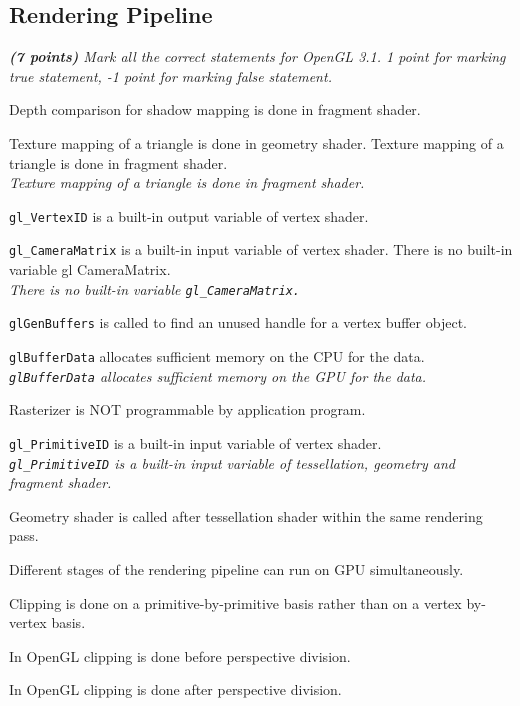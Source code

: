 \documentclass[a4paper,10pt]{article}
\newcommand{\cmark}{\ding{51}}%
\newcommand{\done}{\rlap{$\square$}{\raisebox{2pt}{\large\hspace{1pt}\cmark}}%
	\hspace{-2.5pt}}
\begin{document}
\subsection{Rendering Pipeline}
\textit{\textbf{(7 points)} Mark all the correct statements for OpenGL 3.1. 1 point for marking true statement, -1 point for marking false statement.}
\begin{todolist}
	\item[\done] Depth comparison for shadow mapping is done in fragment shader.
	\item Texture mapping of a triangle is done in geometry shader. Texture mapping of a triangle is done in fragment shader.\\
	\textit{Texture mapping of a triangle is done in fragment shader.}
	\item[\done] \texttt{gl\_VertexID} is a built-in output variable of vertex shader.
	\item \texttt{gl\_CameraMatrix} is a built-in input variable of vertex shader. There is no built-in variable gl CameraMatrix.\\
	\textit{There is no built-in variable \texttt{gl\_CameraMatrix.}}
	\item[\done] \texttt{glGenBuffers} is called to find an unused handle for a vertex buffer object.
	\item \texttt{glBufferData} allocates sufficient memory on the CPU for the data. \\
	\textit{\texttt{glBufferData} allocates sufficient memory on the GPU for the data.}
	\item[\done] Rasterizer is NOT programmable by application program.
	\item \texttt{gl\_PrimitiveID} is a built-in input variable of vertex shader. \\
	\textit{\texttt{gl\_PrimitiveID} is a built-in 	input variable of tessellation, geometry and fragment shader.}
	\item[\done] Geometry shader is called after tessellation shader within the same rendering pass. 
	\item[\done] Different stages of the rendering pipeline can run on GPU simultaneously.
	\item[\done] Clipping is done on a primitive-by-primitive basis rather than on a vertex by-vertex basis.
	\item[\done] In OpenGL clipping is done before perspective division.
	\item In OpenGL clipping is done after perspective division.
\end{todolist}
\end{document}
